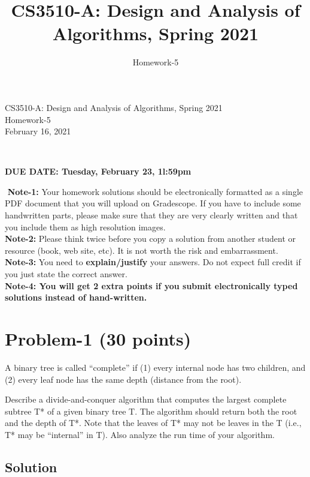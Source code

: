 \documentclass[11pt]{article}
\title{CS3510-A: Design and Analysis of Algorithms, Spring 2021}
\author{Homework-5}
\begin{document}
\begin{center}
    
    \LARGE CS3510-A: Design and Analysis of Algorithms, Spring 2021 \\ \vspace{1em} 
    \large Homework-5 \\ \vspace{0.5em}
    February 16, 2021
\end{center}
\thispagestyle{empty}
\pagestyle{empty}
​
\noindent
\begin{center}
{\bf DUE DATE: Tuesday, February 23, 1l:59pm}
\end{center}
​
\noindent
{\bf Note-1:} Your homework solutions should be electronically formatted as a single PDF document that you will upload on Gradescope. 
If you have to include some handwritten parts, please make sure that they are very clearly written and that you include them as high resolution images. \\
​
\noindent
{\bf Note-2:} Please think twice before you copy a solution from another student or resource (book, web site, etc). 
It is not worth the risk and embarrassment. \\
​
\noindent
{\bf Note-3:} You need to {\bf explain/justify} your answers. Do not expect full credit if you just state the correct answer. \\
​
\noindent
{\bf Note-4: You will get 2 extra points if you submit electronically typed solutions instead of hand-written.} 
​
\newpage
\section*{Problem-1 (30 points)}
A binary tree is called “complete” if (1) every internal node has two children, and (2) every leaf node has the same depth (distance from the root). 


Describe a divide-and-conquer algorithm that computes the largest complete subtree T* of a given binary tree T. The algorithm should return both the root and the depth of T*. Note that the leaves of T* may not be leaves in the T (i.e., T* may be “internal” in T).
Also analyze the run time of your algorithm.


\subsection*{Solution}
\end{document}

